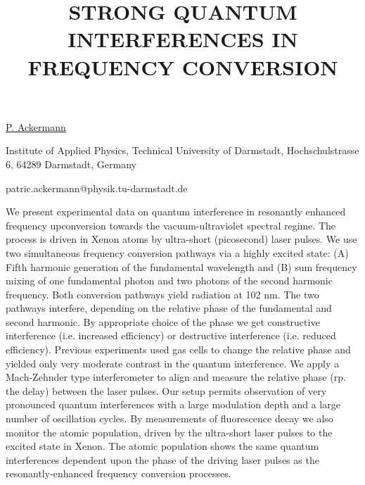 \title{STRONG QUANTUM INTERFERENCES IN FREQUENCY CONVERSION}

\underline{P. Ackermann} 

{\normalsize{\vspace{-4mm}
Institute of Applied Physics, Technical University of Darmstadt, Hochschulstrasse 6, 64289 Darmstadt, Germany

\email patric.ackermann@physik.tu-darmstadt.de}}

We present experimental data on quantum interference in resonantly enhanced frequency upconversion towards the vacuum-ultraviolet spectral regime. The process is driven in Xenon atoms by ultra-short (picosecond) laser pulses. We use two simultaneous frequency conversion pathways via a highly excited state: (A) Fifth harmonic generation of the fundamental wavelength and (B) sum frequency mixing of one fundamental photon and two photons of the second harmonic frequency. Both conversion pathways yield radiation at 102 nm. The two pathways interfere, depending on the relative phase of the fundamental and second harmonic. By appropriate choice of the phase we get constructive interference (i.e. increased efficiency) or destructive interference (i.e. reduced efficiency). Previous experiments used gas cells to change the relative phase and yielded only very moderate contrast in the quantum interference. We apply a Mach-Zehnder type interferometer to align and measure the relative phase (rp. the delay) between the laser pulses. Our setup permits observation of very pronounced quantum interferences with a large modulation depth and a large number of oscillation cycles. By measurements of fluorescence decay we also monitor the atomic population, driven by the ultra-short laser pulses to the excited state in Xenon. The atomic population shows the same quantum interferences dependent upon the phase of the driving laser pulses as the resonantly-enhanced frequency conversion processes.

\vspace{\baselineskip}
